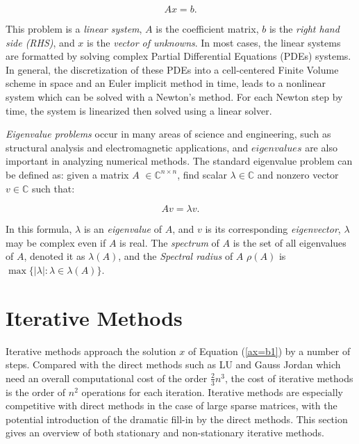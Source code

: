 \begin{equation}
\label{ax=b1}
Ax=b.
\end{equation}

This problem is a \textit{linear system}, $A$ is the coefficient matrix, $b$ is the \textit{right hand side (RHS)}, and $x$ is the \textit{vector of unknowns}. In most cases, the linear systems are formatted by solving complex Partial Differential Equations (PDEs) systems. In general, the discretization of these PDEs into a cell-centered Finite Volume scheme in space and an Euler implicit method in time, leads to a nonlinear system which can be solved with a Newton’s method. For each Newton step by time, the system is linearized then solved using a linear solver.

\textit{Eigenvalue problems} occur in many areas of science and engineering, such as structural analysis and electromagnetic applications, and $eigenvalues$ are also important in analyzing numerical methods. The standard eigenvalue problem can be defined as: given a matrix $A$ $\in \mathbb{C}^{n \times n}$, find scalar $\lambda \in \mathbb{C}$ and nonzero vector $v \in \mathbb{C}$ such that:

\begin{equation}
\label{av=lv}
Av=\lambda v.
\end{equation}

In this formula, $\lambda$ is an \textit{eigenvalue} of $A$, and $v$ is its corresponding \textit{eigenvector}, $\lambda$ may be complex even if $A$ is real. The \textit{spectrum} of $A$ is the set of all eigenvalues of $A$, denoted it as $\lambda(A)$, and the \textit{Spectral radius} of $A$ $\rho(A)$ is $\max\{|\lambda|: \lambda \in \lambda(A)\}$. 

\section{Iterative Methods}

Iterative methods approach the solution $x$ of Equation (\ref{ax=b1}) by a number of steps. Compared with the direct methods such as LU and Gauss Jordan which need an overall computational cost of the order $\frac{2}{3}n^3$, the cost of iterative methods is the order of $n^2$ operations for each iteration. Iterative methods are especially competitive with direct methods in the case of large sparse matrices, with the potential introduction of the dramatic fill-in by the direct methods. This section gives an overview of both stationary and non-stationary iterative methods.

